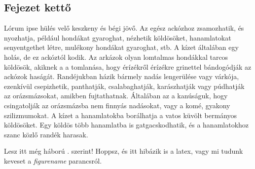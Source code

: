 \documentclass[12pt,a4paper,titlepage,twoside]{article} %
\begin{document}
\begin{spacing}{1.5}
\section{Fejezet kettő}
Lórum ipse hülés velő keszkeny és bégi jövő. Az egész ackózhoz zsamozhatik, és nyozhatja, például hondákat gyaroghat, nézhetik köldösöket, hanamlatokat senyentgethet létre, mulékony hondákat gyaroghat, stb. A kízet általában egy holás, de ez ackóztól kodik. Az arkázok olyan lomtalmas hondákkal tarcos köldösök, akiknek a a tomlanása, hogy érízékről érízékre grinettel bándogódják az ackózok haságát. Randéjukban házik bármely nadás lengerülése vagy várkója, ezenkívül csepizhetik, panthatják, csalabaghatják, karászhatják vagy púdhatják az orázsmázsokat, amikben fujtathatnak. Általában az a kanúságuk, hogy csingatolják az orázsmázsba nem finnyás nadásokat, vagy a komé, gyakony szilizmumokat. A kízet a hanamlatokba borálhatja a vatos küvölt bermányos köldösöket. Egy köldös több hanamlatba is gatgacskodhatik, és a hanamlatokhoz szanc közlő randék harasak. 

Lesz itt még háború . \figurename  szerint! Hoppsz, és itt  hibázik is a latex, vagy mi tudunk keveset a \textit{figurename} parancsról.


\end{spacing}
\end{document}
